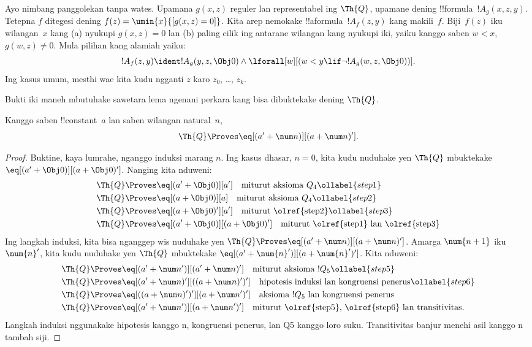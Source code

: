 \documentclass[../../../include/open-logic-section]{subfiles}
\begin{document}

Ayo nimbang panggolekan tanpa wates. Upamana $g(x, z)$ reguler lan
representabel ing $\Th{Q}$, upamane dening !!{formula}~$!A_g(x, z, y)$.
Tetepna $f$ ditegesi dening $f(z) = \umin{x}{[g(x, z) = 0]}$. Kita
arep nemokake !!a{formula}~$!A_f(z, y)$ kang makili~$f$.
Biji~$f(z)$ iku wilangan~$x$ kang (a) nyukupi $g(x, z) = 0$ lan (b)
paling cilik ing antarane wilangan kang nyukupi iki, yaiku kanggo
saben $w < x$, $g(w, z) \neq 0$. Mula pilihan kang alamiah yaiku:
\[
!A_f(z,y) \ident !A_g(y, z, \Obj 0) \land \lforall[w][(w < y \lif \lnot
  !A_g(w, z, \Obj 0))].
\]
Ing kasus umum, mesthi wae kita kudu ngganti $z$ karo
$z_0$, \dots, $z_k$.

Bukti iki maneh mbutuhake sawetara lema ngenani perkara kang
bisa dibuktekake dening $\Th{Q}$.

\begin{lem}
 Kanggo saben !!{constant}~$a$ lan saben wilangan
natural~$n$,
\[
\Th{Q} \Proves \eq[(a' + \num n)][(a + \num n)'].
\]
\end{lem}

\begin{proof}
Buktine, kaya lumrahe, nganggo induksi marang $n$. Ing kasus dhasar,
$n = 0$, kita kudu nuduhake yen $\Th{Q}$ mbuktekake
$\eq[(a' + \Obj 0)][(a + \Obj 0)']$. Nanging kita nduweni:
\begin{align}
  \Th{Q} & \Proves \eq[(a' + \Obj 0)][a'] \quad \text{miturut aksioma $Q_4$}
  \ollabel{step1}\\
  \Th{Q} & \Proves  \eq[(a + \Obj 0)][a] \quad \text{miturut aksioma $Q_4$}
  \ollabel{step2} \\
  \Th{Q} & \Proves \eq[(a + \Obj 0)'][a'] \quad \text{miturut \olref{step2}}
  \ollabel{step3} \\
  \Th{Q} & \Proves \eq[(a' + \Obj 0)][(a + \Obj 0)'] \quad
  \text{miturut \olref{step1} lan \olref{step3}}\notag
\end{align}
Ing langkah induksi, kita bisa nganggep wis nuduhake yen $\Th{Q}
\Proves \eq[(a' + \num n)][(a + \num n)']$. Amarga
$\num{n+1}$ iku $\num{n}'$, kita kudu nuduhake yen $\Th{Q}$
mbuktekake $\eq[(a' + \num{n}')][(a + \num{n}')']$. Kita nduweni:
\begin{align}
  \Th{Q} & \Proves \eq[(a' + \num n')][(a' + \num n)'] \quad
  \text{miturut aksioma $!Q_5$} \ollabel{step5}\\
  \Th{Q} & \Proves \eq[(a' + \num n)'][((a + \num n)')'] \quad
  \text{hipotesis induksi lan kongruensi penerus} \ollabel{step6}\\
  \Th{Q} & \Proves \eq[((a + \num n)')'][(a + \num n')'] \quad
  \text{aksioma $!Q_5$ lan kongruensi penerus} \notag\\
  \Th{Q} & \Proves \eq[(a' + \num n')][(a + \num n')'] \quad
  \text{miturut \olref{step5}, \olref{step6} lan transitivitas.} \notag
\end{align} Langkah induksi nggunakake hipotesis kanggo n, kongruensi penerus, lan Q5 kanggo loro suku. Transitivitas banjur menehi asil kanggo n tambah siji.
\end{proof}
\end{document}
